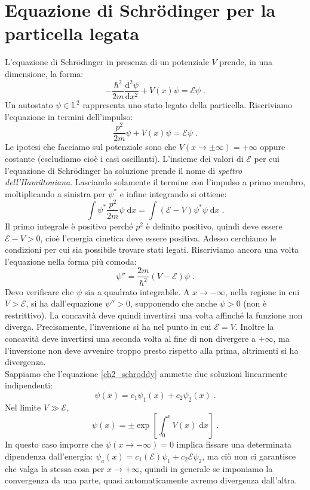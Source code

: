 \documentclass[12pt,a4paper]{report}
\theoremstyle{definition}
\newcommand{\dev}[3][]{\frac{\mathrm{d}^{#1} #2}{\mathrm{d} #3^{#1}}}
\numberwithin{equation}{section}
\newcommand{\diff}[1][]{\mathrm{d}#1}
\begin{document}
\section{Equazione di Schrödinger per la particella legata}
L'equazione di Schrödinger in presenza di un potenziale $V$ prende, in una dimensione, la forma:
\begin{equation}
-\frac{\hbar^2}{2m}\dev[2]{\psi}{x}+V(x)\psi=\mathcal{E}\psi\;.
\end{equation}
Un autostato $\psi\in\mathbb{L}^2$ rappresenta uno stato legato della particella. Riscriviamo l'equazione in termini dell'impulso:
$$
\frac{p^2}{2m}\psi+V(x)\psi=\mathcal{E}\psi\;.
$$
Le ipotesi che facciamo sul potenziale sono che $V(x\to\pm\infty)=+\infty$ oppure costante (escludiamo cioè i casi oscillanti). L'insieme dei valori di $\mathcal{E}$ per cui l'equazione di Schrödinger ha soluzione prende il nome di \textit{spettro dell'Hamiltoniana}. Lasciando solamente il termine con l'impulso a primo membro, moltiplicando a sinistra per $\psi^*$ e infine integrando si ottiene:
\begin{equation}
\int \psi^*\frac{p^2}{2m}\psi\;\diff{x}=\int (\mathcal{E}-V)\psi^*\psi\;\diff{x}\;.
\end{equation}
Il primo integrale è positivo perché $p^2$ è definito positivo, quindi deve essere $\mathcal{E}-V>0$, cioè l'energia cinetica deve essere positiva. Adesso cerchiamo le condizioni per cui sia possibile trovare stati legati. Riscriviamo ancora una volta l'equazione nella forma più comoda:
\begin{equation}
\psi''=\frac{2m}{\hbar^2}(V-\mathcal{E})\psi\;. \label{ch2_schroddy}
\end{equation}
Devo verificare che $\psi$ sia a quadrato integrabile. A $x\to -\infty$, nella regione in cui $V>\mathcal{E}$, si ha dall'equazione $\psi''>0$, supponendo che anche $\psi>0$ (non è restrittivo). La concavità deve quindi invertirsi una volta affinché la funzione non diverga. Precisamente, l'inversione si ha nel punto in cui $\mathcal{E}=V$. Inoltre la concavità deve invertirsi una seconda volta al fine di non divergere a $+\infty$, ma l'inversione non deve avvenire troppo presto rispetto alla prima, altrimenti si ha divergenza. \\
Sappiamo che l'equazione \eqref{ch2_schroddy} ammette due soluzioni linearmente indipendenti:
$$
\psi(x)=c_1\psi_1(x)+c_2\psi_2(x)\;.
$$
Nel limite $V\gg \mathcal{E}$, 
\begin{equation}
\psi(x)=\pm\exp\left[\int_0^x V(x)\;\diff{x}\right]\;.
\end{equation}
In questo caso imporre che $\psi(x\to-\infty)=0$ implica fissare una determinata dipendenza dall'energia: $\psi_a(x)=c_1(\mathcal{E})\psi_1+c_2\mathcal{E}\psi_2$, ma ciò non ci garantisce che valga la stessa cosa per $x\to +\infty$, quindi in generale se imponiamo la convergenza da una parte, quasi automaticamente avremo divergenza dall'altra.
\end{document}

